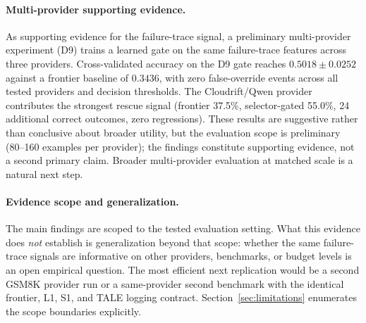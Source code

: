\paragraph{Multi-provider supporting evidence.}
As supporting evidence for the failure-trace signal,
a preliminary multi-provider experiment (D9) trains a learned gate on the same
failure-trace features across three providers.
Cross-validated accuracy on the D9 gate reaches $0.5018 \pm 0.0252$ against a
frontier baseline of $0.3436$, with zero false-override events across all tested
providers and decision thresholds.
The Cloudrift/Qwen provider contributes the strongest rescue signal
(frontier 37.5\%, selector-gated 55.0\%, 24 additional correct outcomes, zero regressions).
These results are suggestive rather than conclusive about broader utility, but
the evaluation scope is preliminary (80--160 examples per provider); the
findings constitute supporting evidence, not a second primary claim.
Broader multi-provider evaluation at matched scale is a natural next step.

\paragraph{Evidence scope and generalization.}
The main findings are scoped to the tested evaluation setting.
What this evidence does \emph{not} establish is generalization beyond that
scope: whether the same failure-trace signals are informative on other
providers, benchmarks, or budget levels is an open empirical question.
The most efficient next replication would be a second GSM8K provider run or a
same-provider second benchmark with the identical frontier, L1, S1, and TALE
logging contract.
Section~\ref{sec:limitations} enumerates the scope boundaries explicitly.
